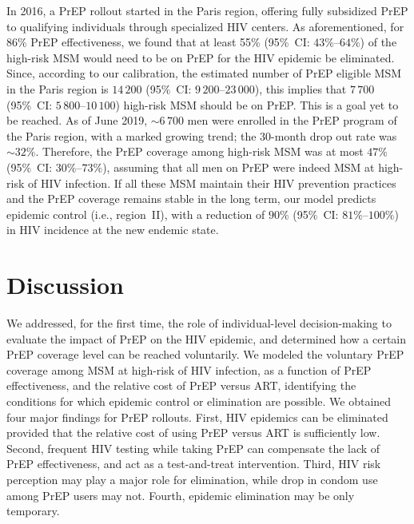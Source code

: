 \documentclass[preprint,review,12pt]{article}			%
\begin{document}
In 2016, a PrEP rollout started in the Paris region, offering fully subsidized PrEP to qualifying individuals through specialized HIV centers. As aforementioned, for $86\%$ PrEP effectiveness, we found that at least 55\% (95\%~CI: $43\%$--$64\%$) of the high-risk MSM would need to be on PrEP for the HIV epidemic be eliminated. Since, according to our calibration, the estimated number of PrEP eligible MSM in the Paris region is $14\,200$ (95\%~CI: $9\,200$--$23\,000$), this implies that $7\,700$ (95\%~CI: $5\,800$--$10\,100$) high-risk MSM should be on PrEP. This is a goal yet to be reached. As of June 2019, $\sim 6\,700$ men were enrolled in the PrEP program of the Paris region,\cite{ANSM2019} with a marked growing trend; the 30-month drop out rate was $\sim 32\%$. \cite{Costagliola2019} Therefore, the PrEP coverage among high-risk MSM was at most $47\%$ (95\%~CI: $30\%$--$73\%$), assuming that all men on PrEP were indeed MSM at high-risk of HIV infection. If all these MSM maintain their HIV prevention practices and the PrEP coverage remains stable in the long term, our model predicts epidemic control (i.e., region~II), with a reduction of $90\%$ (95\%~CI: $81\%$--$100\%$) in HIV incidence at the new endemic state.

\section{Discussion} \label{sec:Discussion}

We addressed, for the first time, the role of individual-level decision-making to evaluate the impact of PrEP on the HIV epidemic, and determined how a certain PrEP coverage level can be reached voluntarily. We modeled the voluntary PrEP coverage among MSM at high-risk of HIV infection, as a function of PrEP effectiveness, and the relative cost of PrEP versus ART, identifying the conditions for which epidemic control or elimination are possible. We obtained four major findings for PrEP rollouts. First, HIV epidemics can be eliminated provided that the relative cost of using PrEP versus ART is sufficiently low. Second, frequent HIV testing while taking PrEP can compensate the lack of PrEP effectiveness, and act as a test-and-treat intervention. Third, HIV risk perception may play a major role for elimination, while drop in condom use among PrEP users may not. Fourth, epidemic elimination may be only temporary.
\end{document}
